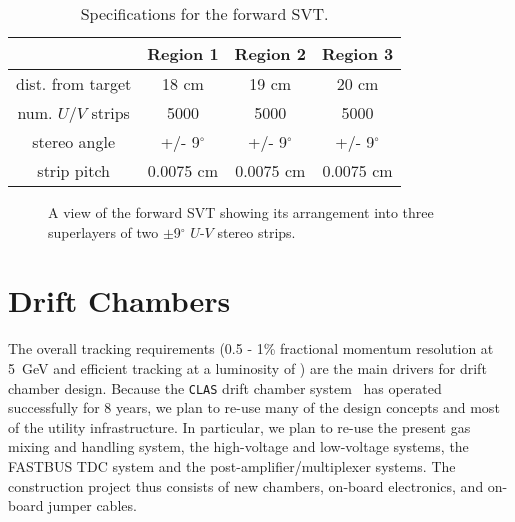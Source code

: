 \begin{table}[htbp]
\begin{center}
\begin{tabular} {||c|c|c|c||} \hline \hline
&{\bf Region 1}    &  {\bf Region 2} & {\bf Region 3}\\ \hline
dist. from target  & 18 cm & 19 cm   & 20 cm \\ \hline
num. $U/V$ strips  & 5000 & 5000  & 5000 \\ \hline
stereo angle       & +/- 9$^{\circ}$ & +/- 9$^{\circ}$   & +/- 9$^{\circ}$ \\ \hline
strip pitch        & 0.0075 cm & 0.0075 cm & 0.0075 cm \\ \hline
\end{tabular}
\caption{\small{Specifications for the forward SVT.}}
\label{fwd-silicon-specs}
\end{center}
\end{table}

\begin{figure}[htbp]
\vspace{7.0cm}
\caption{\small{A view of the forward SVT showing its arrangement into 
three superlayers of two $\pm$9$^{\circ}$ $U$-$V$ stereo strips.}}
\label{fwdsvt}
\end{figure}

\section{Drift Chambers}

The overall tracking requirements (0.5 -  1\% fractional momentum resolution 
at 5~GeV and efficient tracking at a luminosity of ) are the main
drivers for drift chamber design.  Because the {\tt CLAS} drift chamber
system~\cite{dcnim} has operated successfully for 8 years, we plan to 
re-use many of the design concepts and most of the utility infrastructure.  
In particular, we plan to re-use the present gas mixing and handling system, 
the high-voltage and low-voltage systems, the FASTBUS TDC system and the 
post-amplifier/multiplexer systems.  The construction project thus consists 
of new chambers, on-board electronics, and on-board jumper cables.

